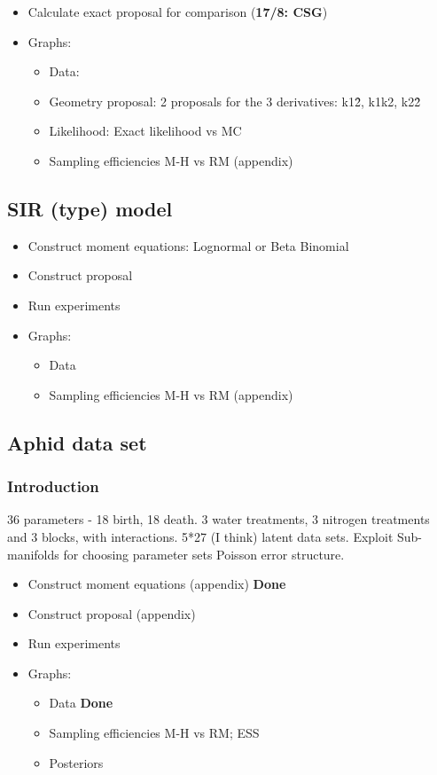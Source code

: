 \documentclass{pnastwo}
\begin{document}
\begin{article}
  \begin{itemize}
  \item Calculate exact proposal for comparison (\textbf{17/8: CSG})
  \item Graphs:
    \begin{itemize}
    \item Data:
    \item Geometry proposal: 2 proposals for the 3 derivatives: k1\^2, k1k2, k2\^2
    \item Likelihood: Exact likelihood vs MC
    \item Sampling efficiencies M-H vs RM (appendix)
    \end{itemize}
  \end{itemize} 
  
\subsection{SIR (type) model}


    \begin{itemize}
    \item Construct moment equations:  Lognormal or Beta Binomial
    \item Construct proposal
    \item Run experiments
    \item Graphs:
      \begin{itemize}
      \item Data
      \item Sampling efficiencies M-H vs RM (appendix)
      \end{itemize}
    \end{itemize}

\subsection{Aphid data set}

\subsubsection{Introduction}

36 parameters - 18 birth, 18 death. 3 water treatments, 3 nitrogen treatments
and 3 blocks, with interactions. 5*27 (I think) latent data sets. Exploit
Sub-manifolds for choosing parameter sets Poisson error structure.


\begin{itemize}
\item Construct moment equations (appendix) \textbf{Done}
\item Construct proposal (appendix)
\item Run experiments
\item Graphs:
      \begin{itemize}
      \item Data \textbf{Done}
      \item Sampling efficiencies M-H vs RM; ESS
      \item Posteriors
      \end{itemize}
    \end{itemize}
    

\end{article}
\end{document}
